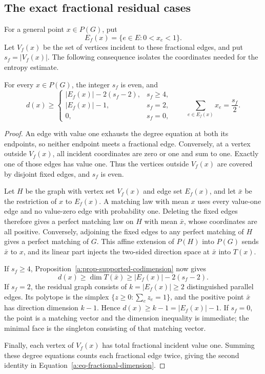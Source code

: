 \subsection{The exact fractional residual cases}

For a general point \(x\in P(G)\), put
\[
 E_f(x)=\{e\in E:0<x_e<1\}.
\]
Let \(V_f(x)\) be the set of vertices incident to these fractional
edges, and put \(s_f=|V_f(x)|\).
The following consequence isolates the coordinates needed for the
entropy estimate.

\begin{corollary}
\label{a:cor-fractional-dimension}
For every \(x\in P(G)\), the integer \(s_f\) is even, and
\begin{equation}
\label{a:eq-fractional-dimension}
 d(x)\ge
 \begin{cases}
 |E_f(x)|-2(s_f-2),&s_f\ge4,\\
 |E_f(x)|-1,&s_f=2,\\
 0,&s_f=0,
 \end{cases}
 \qquad
       \sum_{e\in E_f(x)}x_e=\frac{s_f}{2}.
\end{equation}
\end{corollary}

\begin{proof}
An edge with value one exhausts the degree equation at both its
endpoints, so neither endpoint meets a fractional edge. Conversely,
at a vertex outside \(V_f(x)\), all incident coordinates are zero
or one and sum to one. Exactly one of those edges has value one.
Thus the vertices outside \(V_f(x)\) are covered by disjoint
fixed edges, and \(s_f\) is even.

Let \(H\) be the graph with vertex set \(V_f(x)\) and edge set
\(E_f(x)\), and let \(\bar x\) be the restriction of \(x\) to
\(E_f(x)\). A matching law with mean \(x\) uses every value-one edge
and no value-zero edge with probability one. Deleting the fixed
edges therefore gives a perfect matching law on \(H\) with mean
\(\bar x\), whose coordinates are all positive.
Conversely, adjoining the fixed edges to any perfect matching of
\(H\) gives a perfect matching of \(G\). This affine extension of
\(P(H)\) into \(P(G)\) sends \(\bar x\) to \(x\), and its linear part
injects the two-sided direction space at \(\bar x\) into \(T(x)\).

If \(s_f\ge 4\), Proposition~\ref{a:prop-supported-codimension} now gives
\[
 d(x)\ge \dim T(\bar x)
       \ge |E_f(x)|-2(s_f-2).
\]
If \(s_f=2\), the residual graph consists of
\(k=|E_f(x)|\ge 2\) distinguished parallel edges. Its polytope is
the simplex \(\{z\ge 0:\sum_e z_e=1\}\), and the positive point
\(\bar x\) has direction dimension \(k-1\). Hence
\(d(x)\ge k-1=|E_f(x)|-1\).
If \(s_f=0\), the point is a matching vector and the dimension
inequality is immediate; the minimal face is the singleton consisting
of that matching vector.

Finally, each vertex of \(V_f(x)\) has total fractional incident
value one. Summing these degree equations counts each fractional
edge twice, giving the second identity in
Equation~\eqref{a:eq-fractional-dimension}.
\end{proof}

